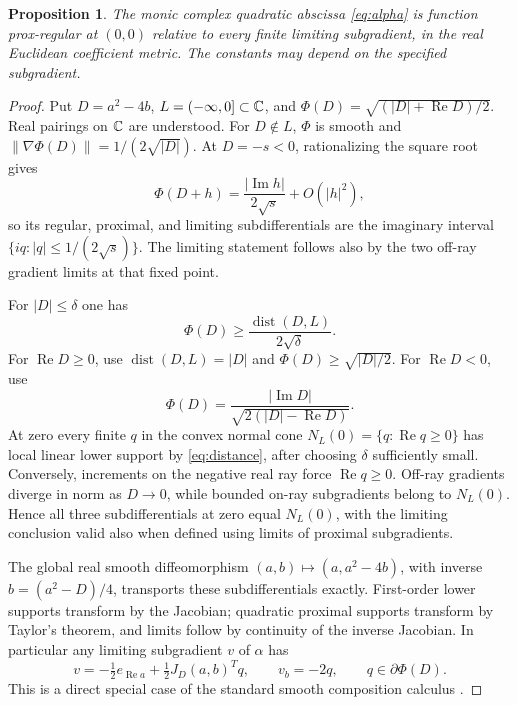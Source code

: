 \documentclass[11pt]{article}
\newtheorem{proposition}[theorem]{Proposition}
\theoremstyle{remark}\newtheorem{remark}[theorem]{Remark}
\newcommand{\norm}[1]{\lVert #1\rVert}
\newcommand{\dist}{\operatorname{dist}}
\newcommand{\Rea}{\operatorname{Re}}
\newcommand{\Ima}{\operatorname{Im}}
\begin{document}
\begin{proposition}\label{prop:function}
The monic complex quadratic abscissa \eqref{eq:alpha} is function prox-regular
at $(0,0)$ relative to every finite limiting subgradient, in the real Euclidean
coefficient metric. The constants may depend on the specified subgradient.
\end{proposition}
\begin{proof}
Put $D=a^2-4b$, $L=(-\infty,0]\subset\mathbb C$, and
$\Phi(D)=\sqrt{(|D|+\Rea D)/2}$. Real pairings on $\mathbb C$ are understood.
For $D\notin L$, $\Phi$ is smooth and
$\norm{\nabla\Phi(D)}=1/(2\sqrt{|D|})$.
At $D=-s<0$, rationalizing the square root gives
\[
 \Phi(D+h)=\frac{|\Ima h|}{2\sqrt{s}}+O(|h|^2),
\]
so its regular, proximal, and limiting subdifferentials are the imaginary
interval $\{iq:|q|\leq1/(2\sqrt{s})\}$. The limiting statement follows
also by the two off-ray gradient limits at that fixed point.

For $|D|\leq\delta$ one has
\begin{equation}\label{eq:distance}
 \Phi(D)\geq\frac{\dist(D,L)}{2\sqrt\delta}.
\end{equation}
For $\Rea D\geq0$, use $\dist(D,L)=|D|$ and
$\Phi(D)\geq\sqrt{|D|/2}$. For $\Rea D<0$, use
\[
 \Phi(D)=\frac{|\Ima D|}{\sqrt{2(|D|-\Rea D)}}.
\]
At zero every finite $q$ in the convex normal cone
$N_L(0)=\{q:\Rea q\geq0\}$ has local linear lower support by
\eqref{eq:distance}, after choosing $\delta$ sufficiently small.
Conversely, increments on the negative real ray force $\Rea q\geq0$.
Off-ray gradients diverge in norm as $D\to0$, while bounded on-ray
subgradients belong to $N_L(0)$. Hence all three subdifferentials at zero
equal $N_L(0)$, with the limiting conclusion valid also when defined using
limits of proximal subgradients.

The global real smooth diffeomorphism $(a,b)\mapsto(a,a^2-4b)$, with inverse
$b=(a^2-D)/4$, transports these subdifferentials exactly. First-order lower
supports transform by the Jacobian; quadratic proximal supports transform
by Taylor's theorem, and limits follow by continuity of the inverse
Jacobian. In particular any limiting subgradient $v$ of $\alpha$ has
\begin{equation}\label{eq:subgrad}
 v=-\tfrac12e_{\Rea a}+\tfrac12 J_D(a,b)^Tq,
 \qquad v_b=-2q,\qquad q\in\partial\Phi(D).
\end{equation}
This is a direct special case of the standard smooth composition calculus
\cite[Theorem~3.1]{PR}.


\end{proof}
\end{document}
